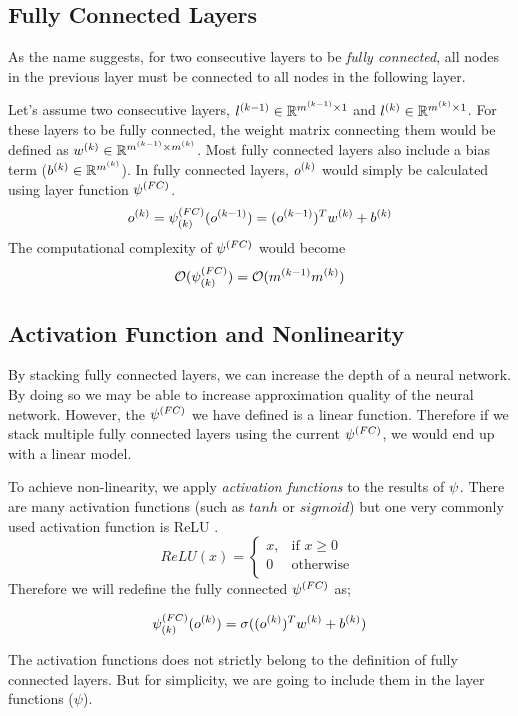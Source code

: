 \subsection{Fully Connected Layers}
As the name suggests, for two consecutive layers to be \textit{fully connected}, all nodes in the previous layer must be connected to all nodes in the following layer. 

Let's assume two consecutive layers, $l^{(k-1)} \in \mathbb{R}^{m^{(k-1)} \times 1}$ and $l^{(k)} \in \mathbb{R}^{m^{(k)} \times 1}$. For these layers to be fully connected, the weight matrix connecting them would be defined as $w^{(k)} \in \mathbb{R}^{m^{(k-1)} \times m^{(k)}}$. Most fully connected layers also include a bias term ($b^{(k)} \in  \mathbb{R}^{m^{(k)}}$). In fully connected layers, $o^{(k)}$ would simply be calculated using layer function $\psi^{(FC)}$.
$$ o^{(k)} = \psi^{(FC)}_{(k)}(o^{(k-1)}) = (o^{(k-1)})^T w^{(k)} + b^{(k)}$$
The computational complexity of $\psi^{(FC)}$ would become
$$\mathcal{O}(\psi^{(FC)}_{(k)}) = \mathcal{O}(m^{(k-1)}m^{(k)})$$

\subsection{Activation Function and Nonlinearity}
By stacking fully connected layers, we can increase the depth of a neural network. By doing so we may be able to increase approximation quality of the neural network. However, the $\psi^{(FC)}$ we have defined is a linear function. Therefore if we stack multiple fully connected layers using the current $\psi^{(FC)}$, we would end up with a linear model. 

To achieve non-linearity, we apply \textit{activation functions} to the results of $\psi$. There are many activation functions (such as $tanh$ or $sigmoid$) but one very commonly used activation function is ReLU \cite{nair2010rectified}.  
\begin{equation}
\label{eq:relu_definition}
    \textit{ReLU}(x) = 
\begin{cases}
    x, & \text{if }x \geq 0\\
    0 &  \text{otherwise }\\
\end{cases}
\end{equation}
Therefore we will redefine the fully connected $\psi^{(FC)}$ as;

$$ \psi^{(FC)}_{(k)}(o^{(k)}) = \sigma((o^{(k)})^Tw^{(k)} + b^{(k)})$$

The activation functions does not strictly belong to the definition of fully connected layers. But for simplicity, we are going to include them in the layer functions ($\psi$).


